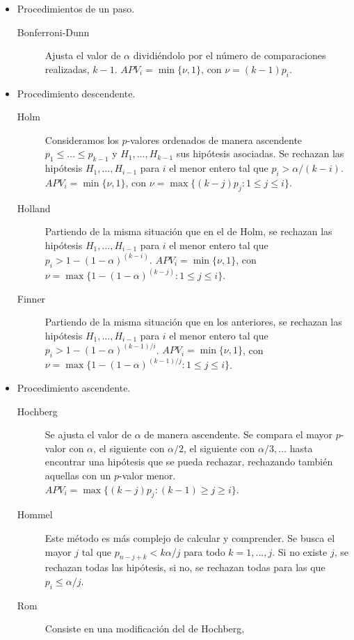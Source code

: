 \begin{itemize}
\item Procedimientos de un paso.
	\begin{description} 
	\item[Bonferroni-Dunn] Ajusta el valor de $\alpha$ 
		dividiéndolo por el número de comparaciones
		realizadas, $k-1$. $APV_i = \min \{\nu,1\}$,
		con $\nu = (k-1)p_i$.
	\end{description}
\item Procedimiento descendente.
	\begin{description} 
	\item[Holm] Consideramos los $p$-valores ordenados
		de manera ascendente $p_1 \leq \dots \leq p_{k-1}$
		y $H_1, \dots, H_{k-1}$ sus hipótesis asociadas.
		Se rechazan las hipótesis $H_1, \dots, H_{i-1}$
		para $i$ el menor entero tal que $p_i > 
		\alpha/(k-i)$. $APV_i = \min \{\nu,1\}$,
		con $\nu = \max \{(k-j)p_j: 1 \leq j \leq i\}$.
	\item[Holland] Partiendo de la misma situación que en
		el de Holm, se rechazan las hipótesis $H_1, \dots, 
		H_{i-1}$ para $i$ el menor entero tal que $p_i > 
		1- (1-\alpha)^(k-i)$. $APV_i = \min \{\nu,1\}$,
		con $\nu = \max \{1- (1-\alpha)^(k-j): 1 \leq j 
		\leq i\}$.
	\item[Finner] Partiendo de la misma situación que en
		los anteriores, se rechazan las hipótesis 
		$H_1, \dots, H_{i-1}$ para $i$ el menor entero tal 
		que $p_i >  1- (1-\alpha)^{(k-1)/i}$. 
		$APV_i = \min \{\nu,1\}$, con $\nu = \max \{1- 
		(1-\alpha)^{(k-1)/j}: 1 \leq j \leq i\}$.
	\end{description}
\item Procedimiento ascendente.
	\begin{description} 
	\item[Hochberg] Se ajusta el valor de $\alpha$ de manera
		ascendente. Se compara el mayor $p$-valor con 
		$\alpha$, el siguiente con $\alpha/2$, el siguiente
		con $\alpha/3, \dots$ hasta encontrar una hipótesis
		que se pueda rechazar, rechazando también aquellas
		con un $p$-valor menor. $APV_i = \max \{(k-j)p_j:
		(k-1) \geq j \geq i \}$.
	\item[Hommel] Este método es más complejo de calcular
		y comprender. Se busca el mayor $j$ tal que 
		$p_{n-j+k} < k\alpha/j$ para todo $k=1,\dots,j$.
		Si no existe $j$, se rechazan todas las hipótesis,
		si no, se rechazan todas para las que $p_i \leq 
		\alpha/j$.
	\item[Rom] Consiste en una modificación del de Hochberg,

\end{description}
\end{itemize}
